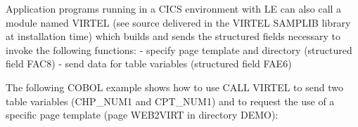 \documentclass[letterpaper,10pt,english]{sphinxmanual}
\begin{document}
\begin{sphinxVerbatim}[commandchars=\\\{\}]
 

         
         
       

  
         
        
                     
         
       
\end{sphinxVerbatim}



Application programs running in a CICS environment with LE can also call a module named VIRTEL (see source
delivered in the VIRTEL SAMPLIB library at installation time) which builds and sends the structured fields necessary to
invoke the following functions:
- specify page template and directory (structured field FAC8)
- send data for table variables (structured field FAE6)


The following COBOL example shows how to use CALL VIRTEL to send two table variables (CHP\_NUM1 and
CPT\_NUM1) and to request the use of a specific page template (page WEB2VIRT in directory DEMO):
\end{document}
